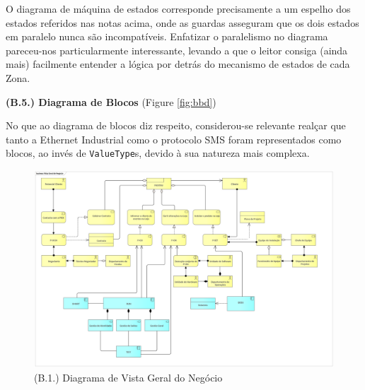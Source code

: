 \documentclass[12pt,a4paper]{article}
\begin{document}
\begin{tcolorbox}[enhanced jigsaw,colback=bg,boxrule=0pt,arc=4pt]
  O diagrama de máquina de estados corresponde precisamente a um espelho dos estados referidos nas notas
  acima, onde as guardas asseguram que os dois estados em paralelo nunca são incompatíveis.
  Enfatizar o paralelismo no diagrama pareceu-nos particularmente interessante, levando
  a que o leitor consiga (ainda mais) facilmente entender a lógica por detrás do mecanismo
  de estados de cada Zona.

  \begin{small}
    \textbf{(B.5.) Diagrama de Blocos} (Figure \ref{fig:bbd})
  \end{small}

  No que ao diagrama de blocos diz respeito, considerou-se relevante realçar que
  tanto a Ethernet Industrial como o protocolo SMS foram representados como blocos,
  ao invés de \texttt{ValueType}s, devido à sua natureza mais complexa.
\end{tcolorbox}

\begin{landscape}
  \begin{figure}
    \centering
    \includegraphics[width=1.4\textwidth]{assets/ea-archimate.png}
    \caption{(B.1.) Diagrama de Vista Geral do Negócio}
    \label{fig:archimate}
  \end{figure}
\end{landscape}
\end{document}

